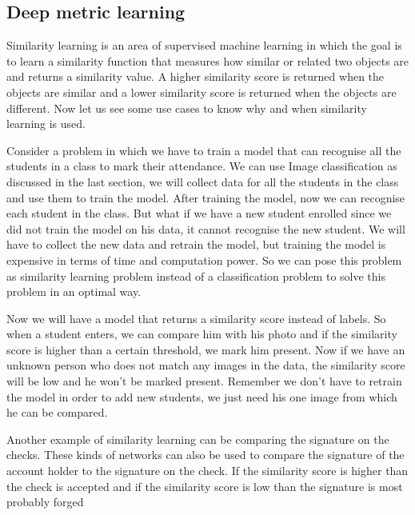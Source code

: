 
\subsection{Deep metric learning}

Similarity learning is an area of supervised machine learning in which the goal is to learn a similarity function that measures how similar or related two objects are and returns a similarity value. A higher similarity score is returned when the objects are similar and a lower similarity score is returned when the objects are different. Now let us see some use cases to know why and when similarity learning is used.

Consider a problem in which we have to train a model that can recognise all the students in a class to mark their attendance. We can use Image classification as discussed in the last section, we will collect data for all the students in the class and use them to train the model. After training the model, now we can recognise each student in the class. But what if we have a new student enrolled since we did not train the model on his data, it cannot recognise the new student. We will have to collect the new data and retrain the model, but training the model is expensive in terms of time and computation power. So we can pose this problem as similarity learning problem instead of a classification problem to solve this problem in an optimal way.

Now we will have a model that returns a similarity score instead of labels. So when a student enters, we can compare him with his photo and if the similarity score is higher than a certain threshold, we mark him present. Now if we have an unknown person who does not match any images in the data, the similarity score will be low and he won’t be marked present. Remember we don’t have to retrain the model in order to add new students, we just need his one image from which he can be compared.

Another example of similarity learning can be comparing the signature on the checks. These kinds of networks can also be used to compare the signature of the account holder to the signature on the check. If the similarity score is higher than the check is accepted and if the similarity score is low than the signature is most probably forged

